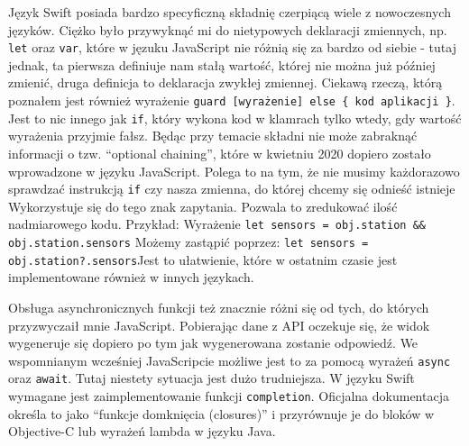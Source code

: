 \documentclass[a4paper,11pt,titlepage]{article}
\begin{document}
Język Swift posiada bardzo specyficzną składnię czerpiącą wiele z nowoczesnych języków. Ciężko było przywyknąć mi do nietypowych deklaracji zmiennych, np. \verb|let| oraz \verb|var|, które w jęzuku JavaScript nie różnią się za bardzo od siebie - tutaj jednak, ta pierwsza definiuje nam stałą wartość, której nie można już później zmienić, druga definicja to deklaracja zwykłej zmiennej. Ciekawą rzeczą, którą poznałem jest również wyrażenie \newline \verb|guard [wyrażenie] else { kod aplikacji }|. Jest to nic innego jak \verb|if|, który wykona kod w klamrach tylko wtedy, gdy wartość wyrażenia przyjmie fałsz. Będąc przy temacie składni nie może zabraknąć informacji o tzw. ``optional chaining'', które w kwietniu 2020 dopiero zostało wprowadzone w języku JavaScript. Polega to na tym, że nie musimy każdorazowo sprawdzać instrukcją \verb|if| czy nasza zmienna, do której chcemy się odnieść istnieje Wykorzystuje się do tego znak zapytania. Pozwala to zredukować ilość nadmiarowego kodu. Przykład:\newline
Wyrażenie \verb|let sensors = obj.station && obj.station.sensors| \newline
Możemy zastąpić poprzez: \verb|let sensors = obj.station?.sensors|\newline Jest to ułatwienie, które w ostatnim czasie jest implementowane również w innych językach.


Obsługa asynchronicznych funkcji też znacznie różni się od tych, do których przyzwyczaił mnie JavaScript. Pobierając dane z API oczekuje się, że widok wygeneruje się dopiero po tym jak wygenerowana zostanie odpowiedź. We wspomnianym wcześniej JavaScripcie możliwe jest to za pomocą wyrażeń \verb|async| oraz \verb|await|. Tutaj niestety sytuacja jest dużo trudniejsza. W języku Swift wymagane jest zaimplementowanie funkcji \verb|completion|. Oficjalna dokumentacja określa to jako ``funkcje domknięcia (closures)'' i przyrównuje je do bloków w Objective-C lub wyrażeń lambda w języku Java.
\end{document}
